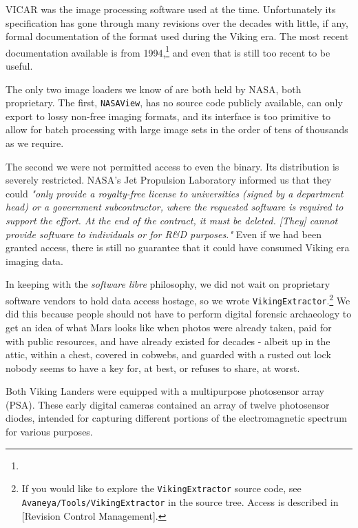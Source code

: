 VICAR was the image processing software used at the time. Unfortunately its specification has gone through many revisions over the decades with little, if any, formal documentation of the format used during the Viking era. The most recent documentation available is from 1994,\footnote{} and even that is still too recent to be useful.

The only two image loaders we know of are both held by NASA, both proprietary. The first, {\tt NASAView}, has no source code publicly available, can only export to lossy non-free imaging formats, and its interface is too primitive to allow for batch processing with large image sets in the order of tens of thousands as we require. 

The second we were not permitted access to even the binary. Its distribution is severely restricted. NASA's Jet Propulsion Laboratory informed us that they could {\it "only provide a royalty-free license to universities (signed by a department head) or a government subcontractor, where the requested software is required to support the effort. At the end of the contract, it must be deleted. [They] cannot provide software to individuals or for R&D purposes."} Even if we had been granted access, there is still no guarantee that it could have consumed Viking era imaging data.


In keeping with the {\it software libre} philosophy, we did not wait on proprietary software vendors to hold data access hostage, so we wrote {\tt VikingExtractor}.\footnote{If you would like to explore the {\tt VikingExtractor} source code, see {\tt Avaneya/Tools/VikingExtractor} in the source tree. Access is described in [Revision Control Management].} We did this because people should not have to perform digital forensic archaeology to get an idea of what Mars looks like when photos were already taken, paid for with public resources, and have already existed for decades - albeit up in the attic, within a chest, covered in cobwebs, and guarded with a rusted out lock nobody seems to have a key for, at best, or refuses to share, at worst.

Both Viking Landers were equipped with a multipurpose photosensor array (PSA). These early digital cameras contained an array of twelve photosensor diodes, intended for capturing different portions of the electromagnetic spectrum for various purposes. 


